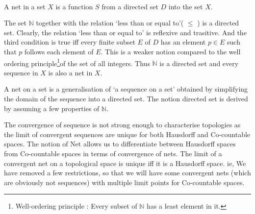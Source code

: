 \begin{definition}[Net]\cite[10.1.2]{joshi}\\
	A net in a set \( X \) is a function \( S \) from a directed set \( D \) into the set \( X \).
\end{definition}

\begin{remark}
\begin{commentary}
	The set \( \mathbb{N} \) together with the relation `less than or equal to'( \( \le \) ) is a directed set. Clearly, the relation `less than or equal to' is reflexive and trasitive. And the third condition is true iff every finite subset \( E \) of \( D \) has an element \( p \in E \) such that \( p \) follows each element of \( E \). This is a weaker notion compared to the well ordering principle\footnote{Well-ordering principle : Every subset of \( \mathbb{N} \) has a least element in it.}of the set of all integers. Thus \( \mathbb{N} \) is a directed set and every sequence in \( X \) is also a net in \( X \).
\end{commentary}
\end{remark}

\begin{remark}
\begin{commentary}
	\par A net on a set is a generalisation of `a sequence on a set' obtained by simplifying the domain of the sequence into a directed set. The notion directed set is derived by assuming a few properties of \( \mathbb{N} \).\\

	\par The convergence of sequence is not strong enough to characterise topologies as the limit of convergent sequences are unique for both Hausdorff and Co-countable spaces. The notion of Net allows us to differentiate between Hausdorff spaces from Co-countable spaces in terms of convergence of nets. The limit of a convergent net on a topological space is unique iff it is a Hausdorff space. ie, We have removed a few restrictions, so that we will have some convergent nets (which are obviously not sequences) with multiple limit points for Co-countable spaces.
\end{commentary}
\end{remark}

